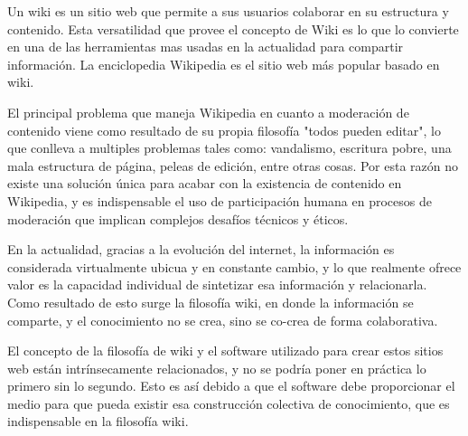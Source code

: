 

Un wiki es un sitio web que permite a sus usuarios colaborar en su estructura y contenido. Esta versatilidad que provee el concepto de Wiki es lo que lo convierte en una de las herramientas mas usadas en la actualidad para compartir información. La enciclopedia Wikipedia es el sitio web más popular basado en wiki. 

El principal problema que maneja Wikipedia en cuanto a moderación de contenido viene como resultado de su propia filosofía "todos pueden editar", lo que conlleva a multiples problemas tales como: vandalismo, escritura pobre, una mala estructura de página, peleas de edición, entre otras cosas. Por esta razón no existe una solución única para acabar con la existencia de  contenido en Wikipedia, y es indispensable el uso de participación humana en procesos de moderación que implican complejos desafíos técnicos y éticos.

En la actualidad, gracias a la evolución del internet, la información es considerada virtualmente ubicua y en constante cambio, y lo que realmente ofrece valor es la capacidad individual de sintetizar esa información y relacionarla. Como resultado de esto surge la filosofía wiki, en donde la información se comparte, y el conocimiento no se crea, sino se co-crea de forma colaborativa.

El concepto de la filosofía de wiki y el software utilizado para crear estos sitios web están intrínsecamente relacionados, y no se podría poner en práctica lo primero sin lo segundo. Esto es así debido a que el software debe proporcionar el medio para que pueda existir esa construcción colectiva de conocimiento, que es indispensable en la filosofía wiki.



